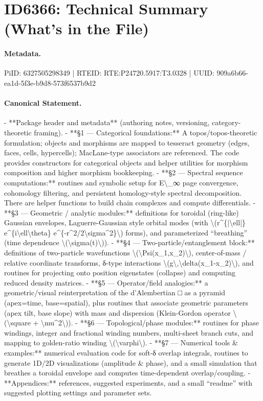 \section*{ID6366: Technical Summary (What’s in the File)}
\paragraph{Metadata.}
PiID: 6327505298349 | RTEID: RTE:P24720.5917:T3.0328 | UUID: 909a6b66-ea1d-5f3e-b9d8-573f6537b9d2

\paragraph{Canonical Statement.}
- **Package header and metadata** (authoring notes, versioning, category-theoretic framing). - **§1 — Categorical foundations:** A topos/topos-theoretic formulation; objects and morphisms are mapped to tesseract geometry (edges, faces, cells, hypercells); MacLane-type associators are referenced. The code provides constructors for categorical objects and helper utilities for morphism composition and higher morphism bookkeeping. - **§2 — Spectral sequence computations:** routines and symbolic setup for E\textbackslash{}\_∞ page convergence, cohomology filtering, and persistent homology-style spectral decomposition. There are helper functions to build chain complexes and compute differentials. - **§3 — Geometric / analytic modules:** definitions for toroidal (ring-like) Gaussian envelopes, Laguerre-Gaussian style orbital modes (with \textbackslash{}(r\textasciicircum{}\{|\textbackslash{}ell|\} e\textasciicircum{}\{i\textbackslash{}ell\textbackslash{}theta\} e\textasciicircum{}\{-r\textasciicircum{}2/2\textbackslash{}sigma\textasciicircum{}2\}\textbackslash{}) forms), and parameterized “breathing” (time dependence \textbackslash{}(\textbackslash{}sigma(t)\textbackslash{})). - **§4 — Two-particle/entanglement block:** definitions of two-particle wavefunctions \textbackslash{}(\textbackslash{}Psi(x\_1,x\_2)\textbackslash{}), center-of-mass / relative coordinate transforms, δ-type interactions \textbackslash{}(g\textbackslash{},\textbackslash{}delta(x\_1-x\_2)\textbackslash{}), and routines for projecting onto position eigenstates (collapse) and computing reduced density matrices. - **§5 — Operator/field analogies:** a geometric/visual reinterpretation of the d’Alembertian □ as a pyramid (apex=time, base=spatial), plus routines that associate geometric parameters (apex tilt, base slope) with mass and dispersion (Klein-Gordon operator \textbackslash{}(\textbackslash{}square + \textbackslash{}mu\textasciicircum{}2\textbackslash{})). - **§6 — Topological/phase modules:** routines for phase windings, integer and fractional winding numbers, multi-sheet branch cuts, and mapping to golden-ratio winding \textbackslash{}(\textbackslash{}varphi\textbackslash{}). - **§7 — Numerical tools \& examples:** numerical evaluation code for soft-δ overlap integrals, routines to generate 1D/2D visualizations (amplitude \& phase), and a small simulation that breathes a toroidal envelope and computes time-dependent overlap/coupling. - **Appendices:** references, suggested experiments, and a small “readme” with suggested plotting settings and parameter sets.

